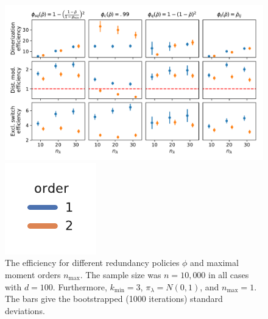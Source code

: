 \begin{figure}[htb]
    \centering    
    \begin{minipage}{.9\textwidth}
    \centering
    \includegraphics[scale=.4]{gfx/efficiency_ord1.pdf}
    \end{minipage}\hspace{-1em}
    \begin{minipage}{0.09\textwidth}
    \centering
    \includegraphics[scale=.55]{gfx/legend_orders.pdf}
    \end{minipage}
	\caption[Influence of the redundancy heuristic
	and moment orders]{The efficiency for different redundancy policies $\phi$ and maximal 
    moment orders $n_{\max}$. The sample size was $n=10,\!000$ in all cases
    with $d=100$. Furthermore, $k_{\min}=3$, $\pi_\lambda=N(0,1)$, and $n_{\max}=1$.
    The bars give the 
    bootstrapped (1000 iterations) standard deviations.\label{fig:efficiencies_order}}
\end{figure}
